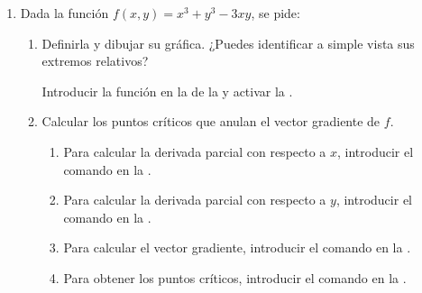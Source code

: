 \begin{enumerate}[leftmargin=*]
\item Dada la función $f(x,y)=x^3+y^3-3xy$, se pide:
      \begin{enumerate}
      \item Definirla y dibujar su gráfica. ¿Puedes identificar a simple vista sus extremos relativos?
            \begin{indication}
            Introducir la función  en la  de la  y activar la .
            \end{indication}

      \item Calcular los puntos críticos que anulan el vector gradiente de $f$.
            \begin{indication}
            \begin{enumerate}
            \item Para calcular la derivada parcial con respecto a $x$, introducir el comando  en la .
            \item Para calcular la derivada parcial con respecto a $y$, introducir el comando  en la .
            \item Para calcular el vector gradiente, introducir el comando  en la .
            \item Para obtener los puntos críticos, introducir el comando  en la .
            \end{enumerate}
            \end{indication}


\end{enumerate}
\end{enumerate}
